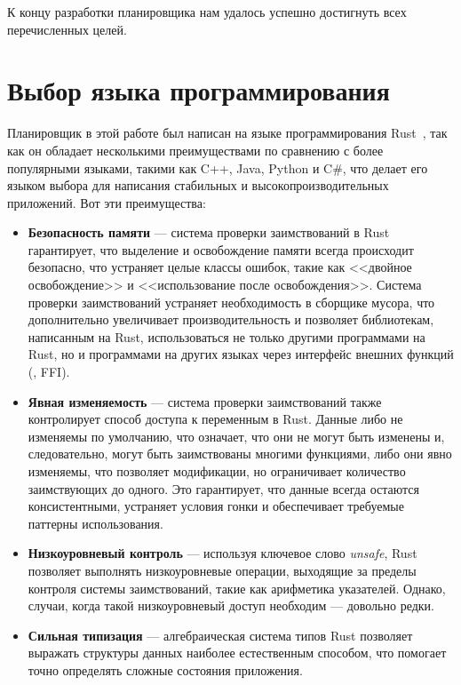 К концу разработки планировщика нам удалось успешно
достигнуть всех перечисленных целей.

\section{Выбор языка программирования}

Планировщик в этой работе был написан на языке программирования Rust~\cite{rust},
так как он обладает несколькими преимуществами по сравнению с более популярными языками,
такими как C++, Java, Python и C\#,
что делает его языком выбора для написания стабильных
и высокопроизводительных приложений. Вот эти преимущества:

\begin{itemize}
  \item \textbf{Безопасность памяти} --- система проверки заимствований в Rust гарантирует,
    что выделение и освобождение памяти всегда происходит безопасно,
    что устраняет целые классы ошибок, такие как <<двойное освобождение>>
    и <<использование после освобождения>>.
    Система проверки заимствований устраняет необходимость в сборщике мусора,
    что дополнительно увеличивает производительность и позволяет библиотекам,
    написанным на Rust, использоваться не только другими программами на Rust,
    но и программами на других языках через интерфейс внешних функций
    (, FFI).
  \item \textbf{Явная изменяемость} --- система проверки заимствований
    также контролирует способ доступа к переменным в Rust.
    Данные либо не изменяемы по умолчанию, что означает, что они не могут быть изменены и,
    следовательно, могут быть заимствованы многими функциями,
    либо они явно изменяемы, что позволяет модификации,
    но ограничивает количество заимствующих до одного.
    Это гарантирует, что данные всегда остаются консистентными,
    устраняет условия гонки и обеспечивает требуемые паттерны использования.
  \item \textbf{Низкоуровневый контроль} --- используя ключевое слово \textit{unsafe},
    Rust позволяет выполнять низкоуровневые операции,
    выходящие за пределы контроля системы заимствований,
    такие как арифметика указателей.
    Однако, случаи, когда такой низкоуровневый доступ необходим --- довольно редки.
  \item \textbf{Сильная типизация} --- алгебраическая система типов Rust
    позволяет выражать структуры данных наиболее естественным способом,
    что помогает точно определять сложные состояния приложения.

\end{itemize}
